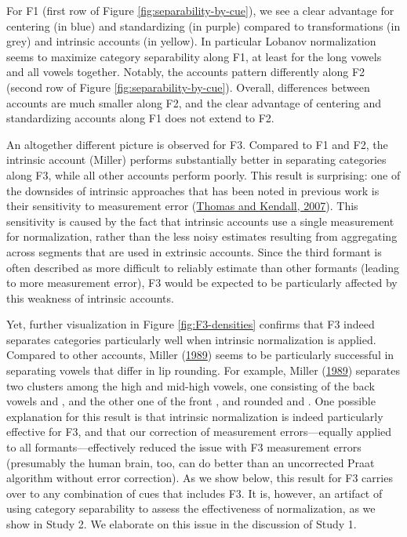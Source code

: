 \documentclass[utf8]{frontiersSCNS}
\begin{document}
For F1 (first row of Figure \ref{fig:separability-by-cue}), we see a clear advantage for centering (in blue) and standardizing (in purple) compared to transformations (in grey) and intrinsic accounts (in yellow). In particular Lobanov normalization seems to maximize category separability along F1, at least for the long vowels and all vowels together. Notably, the accounts pattern differently along F2 (second row of Figure \ref{fig:separability-by-cue}). Overall, differences between accounts are much smaller along F2, and the clear advantage of centering and standardizing accounts along F1 does not extend to F2.

An altogether different picture is observed for F3. Compared to F1 and F2, the intrinsic account (Miller) performs substantially better in separating categories along F3, while all other accounts perform poorly. This result is surprising: one of the downsides of intrinsic approaches that has been noted in previous work is their sensitivity to measurement error (\protect\hyperlink{ref-thomas2007}{Thomas and Kendall, 2007}). This sensitivity is caused by the fact that intrinsic accounts use a single measurement for normalization, rather than the less noisy estimates resulting from aggregating across segments that are used in extrinsic accounts. Since the third formant is often described as more difficult to reliably estimate than other formants (leading to more measurement error), F3 would be expected to be particularly affected by this weakness of intrinsic accounts.

Yet, further visualization in Figure \ref{fig:F3-densities} confirms that F3 indeed separates categories particularly well when intrinsic normalization is applied. Compared to other accounts, Miller (\protect\hyperlink{ref-miller1989c}{1989}) seems to be particularly successful in separating vowels that differ in lip rounding. For example, Miller (\protect\hyperlink{ref-miller1989c}{1989}) separates two clusters among the high and mid-high vowels, one consisting of the back vowels \ipatext{[oː]} and \ipatext{[uː]}, and the other one of the front \ipatext{[iː]}, and rounded \ipatext{[yː]} and \ipatext{[ʉː]}. One possible explanation for this result is that intrinsic normalization is indeed particularly effective for F3, and that our correction of measurement errors---equally applied to all formants---effectively reduced the issue with F3 measurement errors (presumably the human brain, too, can do better than an uncorrected Praat algorithm without error correction). As we show below, this result for F3 carries over to any combination of cues that includes F3. It is, however, an artifact of using category separability to assess the effectiveness of normalization, as we show in Study 2. We elaborate on this issue in the discussion of Study 1.
\end{document}
